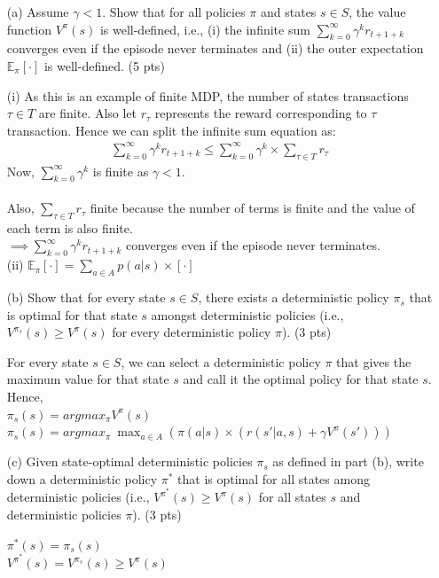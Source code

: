 \documentclass[12pt]{article}
\begin{document}
\begin{itemize}
\item[(a)] Assume $\gamma < 1$. Show that for all policies $\pi$ and states $s \in S$, the value function $V^\pi(s)$ is well-defined, i.e., (i) the infinite sum $\sum_{k=0}^\infty \gamma^kr_{t + 1 + k}$ converges even if the episode never terminates and (ii) the outer expectation $\mathbb{E}_\pi[\cdot]$ is well-defined. (5 pts)

\begin{solution}
(i) As this is an example of finite MDP, the number of states transactions $\tau \in T$ are finite. Also let $r_{\tau}$ represents the reward corresponding to $\tau$ transaction. Hence we can split the infinite sum equation as:
\begin{align}
\sum_{k=0}^\infty \gamma^k r_{t + 1 + k} \leq \sum_{k=0}^\infty \gamma^k \times \sum_{\tau \in T} r_{\tau} 
\end{align}
Now, $\sum_{k=0}^\infty \gamma^k$ is finite as $\gamma<1$. \\ \\
Also, $\sum_{\tau \in T} r_{\tau}$ finite because the number of terms is finite and the value of each term is also finite.\\

$\implies \sum_{k=0}^\infty \gamma^k r_{t + 1 + k}$ converges even if the episode never terminates.\\ 

(ii) $\mathbb{E}_\pi[\cdot] = \sum_{a \in A} p(a|s) \times [\cdot]$
\end{solution}


\item[(b)] Show that for every state $s\in S$, there exists a deterministic policy $\pi_s$ that is optimal for that state $s$ amongst deterministic policies (i.e., $V^{\pi_s}(s) \ge V^{\pi}(s)$ for every deterministic policy $\pi$). (3 pts)

\begin{solution}
For every state $s \in S$, we can select a deterministic policy $\pi$ that gives the maximum value for that state $s$ and call it the optimal policy for that state $s$. Hence, \\
$ \pi_s(s) = argmax_\pi V^\pi (s)$ \\ 
$ \pi_s(s) = argmax_\pi \ \max_{a \in A} (\pi(a|s)\times (r(s'|a,s) + \gamma V^{\pi}(s')))$
\end{solution}

\item[(c)] Given state-optimal deterministic policies $\pi_s$ as defined in part (b), write down a deterministic policy $\pi^*$ that is optimal for all states among deterministic policies (i.e., $V^{\pi^*}(s) \ge V^{\pi}(s)$ for all states $s$ and deterministic policies $\pi$). (3 pts)

\begin{solution}
$\pi^*(s) = \pi_s(s)$ \\
$V^{\pi^*}(s) = V^{\pi_s}(s) \ge V^{\pi}(s)$
\end{solution}

\end{itemize}
\end{document}
